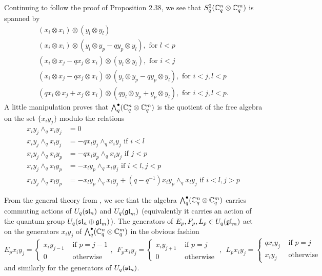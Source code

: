 \documentclass[11pt,leqno]{article}
\begin{document}
Continuing to follow the proof of Proposition 2.38, we see that $ S^2_q (\bC_q^n \otimes \bC_q^m) $ is spanned by
\begin{gather*}
(x_i \otimes x_i) \otimes (y_l \otimes y_l) \\
(x_i \otimes x_i) \otimes (y_l \otimes y_p - q y_p \otimes y_l), \text{ for } l < p \\
(x_i \otimes x_j - q x_j \otimes x_i) \otimes (y_l \otimes y_l), \text{ for } i < j \\
(x_i \otimes x_j - q x_j \otimes x_i) \otimes (y_l \otimes y_p - q y_p \otimes y_l), \text{ for } i < j, l < p \\
(q x_i \otimes x_j +  x_j \otimes x_i) \otimes (q y_l \otimes y_p +  y_p \otimes y_l), \text{ for } i < j, l < p.
\end{gather*}
A little manipulation proves that $ \Alt^\bullet_q(\bC_q^n \otimes \bC_q^m) $ is the quotient of the free algebra on the set $ \{ x_i y_j \} $ modulo the relations
\begin{align*}
x_iy_j \wedge_q x_i y_j &= 0 \\
x_iy_j \wedge_q x_l y_j &= - q x_l y_j \wedge_q x_i y_j  \text{ if } i < l \\
x_i y_j \wedge_q x_i y_p &= - q x_i y_p \wedge_q x_i y_j \text{ if } j < p \\
x_i y_j \wedge_q x_l y_p &= -x_l y_p \wedge_q x_i y_j \text{ if  } i < l, j < p \\
x_i y_j \wedge_q x_l y_p &= -x_l y_p \wedge_q x_i y_j + (q - q^{-1}) x_i y_p \wedge_q x_l y_j \text{ if } i < l, j > p 
\end{align*}

From the general theory from \cite{BZ}, we see that the algebra $ \Alt^\bullet_q(\bC_q^n \otimes \bC_q^m) $ carries commuting actions of $ U_q(\sl_n) $ and $ U_q(\gl_m) $ (equivalently it carries an action of the quantum group $ U_q(\sl_n \oplus \gl_m) $).  The generators of $E_p, F_p, L_p \in U_q(\gl_m) $ act on the generators $ x_i y_j $ of $\Alt^\bullet_q(\bC_q^n \otimes \bC_q^m) $ in the obvious fashion
$$ E_p x_i y_j = \begin{cases} x_i y_{j-1} & \text{ if } p = j-1  \\
 0 & \text{  otherwise }
 \end{cases}, \ \ 
F_p x_i y_j = \begin{cases} x_i y_{j+1} & \text{ if } p = j \\
 0 & \text{ otherwise }
 \end{cases}, \ \ 
L_p x_i y_j = \begin{cases} q x_i y_j & \text{ if } p = j \\
x_i y_j & \text{ otherwise }
\end{cases}$$
and similarly for the generators of $ U_q(\sl_n) $.
\end{document}
